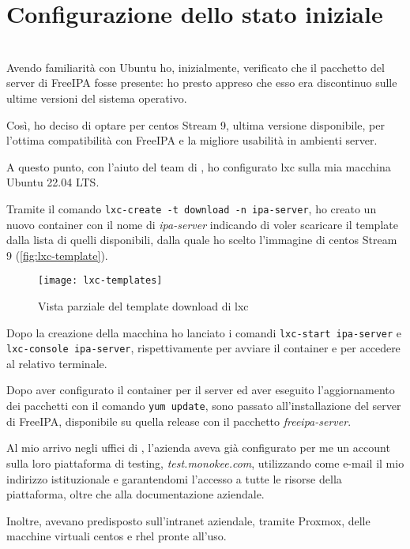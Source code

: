 
\chapter{Configurazione dello stato iniziale}
\label{cap:configurazione-stato-iniziale}

\\

Avendo familiarità con Ubuntu ho, inizialmente, verificato che il pacchetto del server di FreeIPA fosse presente: ho presto appreso che esso era discontinuo sulle ultime versioni del sistema operativo.

Così, ho deciso di optare per \acrshort{centos} Stream 9, ultima versione disponibile, per l'ottima compatibilità con FreeIPA e la migliore usabilità in ambienti server.

A questo punto, con l'aiuto del team di \myAzienda, ho configurato \acrshort{lxc} sulla mia macchina Ubuntu 22.04 LTS.

Tramite il comando \texttt{lxc-create -t download -n ipa-server}, ho creato un nuovo container con il nome di \emph{ipa-server} indicando di voler scaricare il template dalla lista di quelli disponibili, dalla quale ho scelto l'immagine di \acrshort{centos} Stream 9 (\autoref{fig:lxc-template}).

\begin{figure}[!h] 
    \centering 
    \texttt{[image: lxc-templates]} 
    \caption{Vista parziale del template download di \acrshort{lxc}}
    \label{fig:lxc-template}
\end{figure}

Dopo la creazione della macchina ho lanciato i comandi \texttt{lxc-start ipa-server} e \texttt{lxc-console ipa-server}, rispettivamente per avviare il container e per accedere al relativo terminale.


Dopo aver configurato il container per il server ed aver eseguito l'aggiornamento dei pacchetti con il comando \texttt{yum update}, sono passato all'installazione del server di FreeIPA, disponibile su quella release con il pacchetto \emph{freeipa-server}.


Al mio arrivo negli uffici di \myAzienda, l'azienda aveva già configurato per me un account sulla loro piattaforma di testing, \emph{test.monokee.com}, utilizzando come e-mail il mio indirizzo istituzionale e garantendomi l'accesso a tutte le risorse della piattaforma, oltre che alla documentazione aziendale.

Inoltre, avevano predisposto sull'intranet aziendale, tramite Proxmox, delle macchine virtuali \acrshort{centos} e \acrshort{rhel} pronte all'uso.